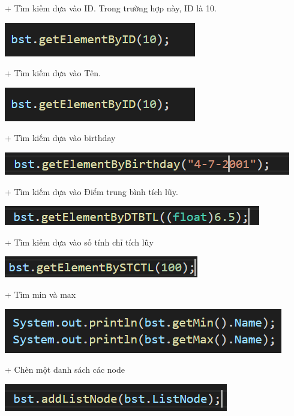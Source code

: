 \documentclass{report}
\begin{document}
+ Tìm kiếm dựa vào ID. Trong trường hợp này, ID là 10.
\begin{center}
     \includegraphics[scale=1.2]{x}
    \end{center}

+ Tìm kiếm dựa vào Tên.
\begin{center}
     \includegraphics[scale=1.2]{x}
    \end{center}
+ Tìm kiếm dựa vào birthday
\begin{center}
     \includegraphics[scale=1.2]{y}
    \end{center}
+ Tìm kiếm dựa vào Điểm trung bình tích lũy.
\begin{center}
     \includegraphics[scale=1.2]{z}
    \end{center}
+ Tìm kiếm dựa vào số tính chỉ tích lũy
\begin{center}
     \includegraphics[scale=1.2]{a1}
    \end{center}
+ Tìm min và max
\begin{center}
     \includegraphics[scale=1.2]{a2}
    \end{center}

+ Chèn một danh sách các node
\begin{center}
     \includegraphics[scale=1.2]{a3}
    \end{center}
\end{document}
